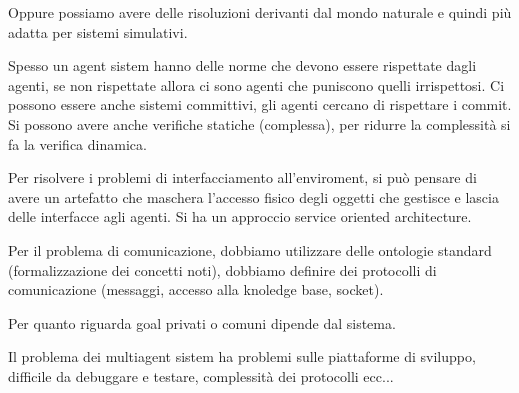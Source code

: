 Oppure possiamo avere delle risoluzioni derivanti dal mondo naturale e quindi 
più adatta per sistemi simulativi.

Spesso un agent sistem hanno delle norme che devono essere rispettate dagli agenti,
se non rispettate allora ci sono agenti che puniscono quelli irrispettosi. Ci possono 
essere anche sistemi committivi, gli agenti cercano di rispettare i commit. Si possono 
avere anche verifiche statiche (complessa), per ridurre la complessità si fa la 
verifica dinamica.

Per risolvere i problemi di interfacciamento all'enviroment, si può pensare 
di avere un artefatto che maschera l'accesso fisico degli oggetti che gestisce 
e lascia delle interfacce agli agenti. Si ha un approccio service oriented architecture. 

Per il problema di comunicazione, dobbiamo utilizzare delle ontologie standard 
(formalizzazione dei concetti noti), dobbiamo definire dei protocolli di comunicazione
(messaggi, accesso alla knoledge base, socket).

Per quanto riguarda goal privati o comuni dipende dal sistema.

Il problema dei multiagent sistem ha problemi sulle piattaforme di sviluppo, 
difficile da debuggare e testare, complessità dei protocolli ecc...
